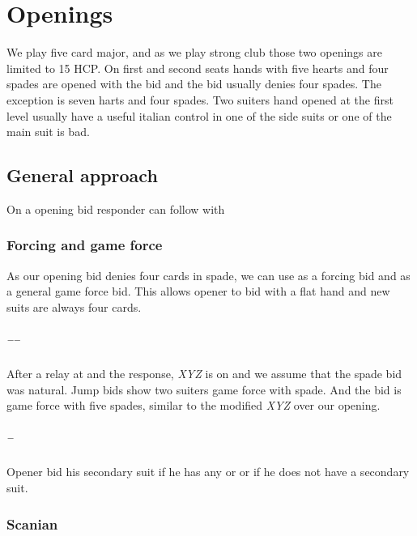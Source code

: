 \chapter{\bid{1\HS/\SpS} Openings}
We play five card major, and as we play strong club those two openings are limited to 15 HCP. On first and second seats hands with five hearts and four spades are opened with the \bid{2\HS} bid and the \bid{1\HS} bid usually denies four spades. The exception is seven harts and four spades. Two suiters hand opened at the first level usually have a useful italian control in one of the side suits or one of the main suit is bad.
\section{General approach}
On a \bid{1\HS/\SpS} opening bid responder can follow with
\subsection{\bid{1\SpS} Forcing and \bid{1\NT} game force}
As our \bid{1\HS} opening bid denies four cards in spade, we can use \bid{1\SpS} as a forcing bid and \bid{1\NT} as a general game force bid. This allows opener to bid \bid{1\NT} with a flat hand and new suits are always four cards. 
\paragraph{\bid{1\HS}–\bid{1\SpS}–\bid{1\NT}}
After a relay at \bid{1\SpS} and the \bid{1\NT} response, \emph{XYZ} is on and we assume that the spade bid was natural. Jump bids show two suiters game force with spade. And the \bid{2\NT} bid is game force with five spades, similar to the modified \emph{XYZ} over our \bid{1\DS} opening.
\paragraph{\bid{1\HS}–\bid{1\NT}}
Opener bid his secondary suit if he has any or \bid{2\SpS} or \bid{2\NT} if he does not have a secondary suit.
\subsection{Scanian}